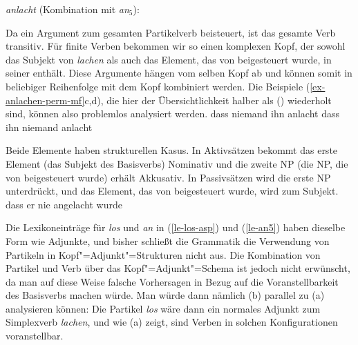 \eas
\emph{anlacht} (Kombination mit \emph{an$_5$}):\\
\zs

\noindent
Da \anf ein Argument zum gesamten Partikelverb beisteuert, ist das gesamte Verb transitiv.
Für finite Verben bekommen wir so einen komplexen Kopf, der sowohl das Subjekt von \emph{lachen}
als auch das Element, das von \anf beigesteuert wurde, in seiner \compsl enthält.
Diese Argumente hängen vom selben Kopf ab und können somit in beliebiger Reihenfolge
mit dem Kopf kombiniert werden. Die Beispiele (\ref{ex-anlachen-perm-mf}c,d), die hier
der Übersichtlichkeit halber als () wiederholt sind, können also problemlos analysiert werden.
\eal
\ex
dass    niemand           ihn           anlacht
\ex
dass    ihn           niemand          anlacht
\zl

\noindent
Beide Elemente haben strukturellen Kasus. In Aktivsätzen bekommt das erste Element (das Subjekt des Basisverbs)
Nominativ und die zweite NP (die NP, die von \anf beigesteuert wurde) erhält Akkusativ.
In Passivsätzen wird die erste NP unterdrückt, und das Element, das von \anf beigesteuert wurde,
wird zum Subjekt.
\ea
dass    er       nie   angelacht          wurde
\z

\noindent
Die Lexikoneinträge für \emph{los} und \emph{an} in (\ref{le-los-asp}) und (\ref{le-an5})
haben dieselbe Form wie Adjunkte, und bisher schließt die Grammatik die Verwendung von Partikeln
in Kopf"=Adjunkt"=Strukturen nicht aus. Die Kombination von Partikel und Verb über das
Kopf"=Adjunkt"=Schema ist jedoch nicht erwünscht, da man auf diese Weise falsche Vorhersagen in Bezug
auf die Voranstellbarkeit des Basisverbs machen würde. Man würde dann nämlich (b) parallel
zu (a) analysieren können:
\eal
{}
\zl
Die Partikel \emph{los} wäre dann ein normales Adjunkt zum Simplexverb \emph{lachen},
und wie (a) zeigt, sind Verben in solchen Konfigurationen voranstellbar.

